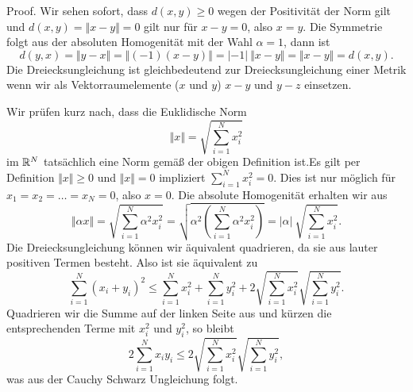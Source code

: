 \begin{emphBox}{}{}
Proof. Wir sehen sofort, dass \(d(x,y) \geq 0\) wegen der Positivität der Norm gilt und \(d(x,y) = \Vert x - y\Vert = 0\) gilt nur für \(x-y = 0\), also \(x=y\). Die Symmetrie folgt aus der absoluten Homogenität mit der Wahl \(\alpha = 1\), dann ist
\begin{equation*}
 d(y,x) = \Vert y- x \Vert = \Vert (-1)(x-y) \Vert = |-1|~\Vert x -y \Vert = \Vert x-y \Vert = d(x,y).
\end{equation*}
Die Dreiecksungleichung ist  gleichbedeutend zur Dreiecksungleichung einer Metrik wenn wir als Vektorraumelemente (\(x\) und \(y\)) \(x-y\) und \(y-z\) einsetzen.
\end{emphBox}
\label{metrik/normen:example-3}
\begin{example}{}{}



Wir prüfen kurz nach, dass die Euklidische Norm
\begin{equation*}
 \Vert x \Vert = \sqrt{\sum_{i=1}^N x_i^2}
\end{equation*}
im \(\mathbb{R}^N\) tatsächlich eine Norm gemäß der obigen Definition ist.Es gilt per Definition \(\Vert x \Vert \geq 0\) und \(\Vert x \Vert = 0\) impliziert \(\sum_{i=1}^N x_i^2=0\). Dies ist nur möglich für \(x_1=x_2=\ldots=x_N=0\), also \(x=0\). Die absolute Homogenität erhalten wir aus
\begin{equation*}
 \Vert \alpha x \Vert = \sqrt{\sum_{i=1}^N \alpha ^2 x_i^2} = \sqrt{\alpha^2 (\sum_{i=1}^N \alpha ^2 x_i^2)} = |\alpha|~ \sqrt{\sum_{i=1}^N x_i^2}.\end{equation*}
Die Dreiecksungleichung können wir äquivalent quadrieren, da sie aus lauter positiven Termen besteht. Also ist sie äquivalent zu
\begin{equation*}
  {\sum_{i=1}^N (x_i+y_i)^2} \leq \sum_{i=1}^N x_i^2 + \sum_{i=1}^N y_i^2 + 2 \sqrt{\sum_{i=1}^N x_i^2} \sqrt{\sum_{i=1}^N y_i^2}.
\end{equation*}
Quadrieren wir die Summe auf der linken Seite aus und kürzen die entsprechenden Terme mit \(x_i^2\) und \(y_i^2\), so bleibt
\begin{equation*}
 2 \sum_{i=1}^N x_i y_i \leq 2 \sqrt{\sum_{i=1}^N x_i^2} \sqrt{\sum_{i=1}^N y_i^2},
\end{equation*}
was aus der Cauchy Schwarz Ungleichung folgt.
\end{example}

